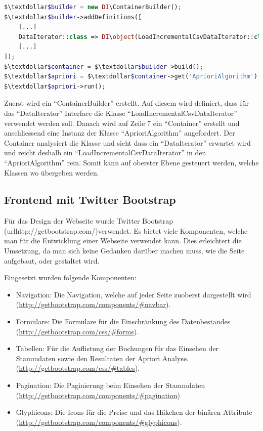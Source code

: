\begin{lstlisting}[language=php]
$\textdollar$builder = new DI\ContainerBuilder();
$\textdollar$builder->addDefinitions([
    [...]
    DataIterator::class => DI\object(LoadIncrementalCsvDataIterator::class),
    [...]
]);
$\textdollar$container = $\textdollar$builder->build();
$\textdollar$apriori = $\textdollar$container->get('AprioriAlgorithm');
$\textdollar$apriori->run();
\end{lstlisting}

Zuerst wird ein "`ContainerBuilder"' erstellt. Auf diesem wird definiert, dass für das "`DataIterator"' Interface die Klasse "`LoadIncrementalCsvDataIterator"' verwendet werden soll. Danach wird auf Zeile 7 ein "`Container"' erstellt und anschliessend eine Instanz der Klasse "`AprioriAlgorithm"' angefordert. Der Container analysiert die Klasse und sieht dass ein "`DataIterator"' erwartet wird und reicht deshalb ein "`LoadIncrementalCsvDataIterator"' in den "`AprioriAlgorithm"' rein. Somit kann auf oberster Ebene gesteuert werden, welche Klassen wo übergeben werden.

\subsection{Frontend mit Twitter Bootstrap}
\label{sec:proofofconcept:externebibliotheken:bootstrap}
Für das Design der Webseite wurde Twitter Bootstrap (url{http://getbootstrap.com/})verwendet. Es bietet viele Komponenten, welche man für die Entwicklung einer Webseite verwendet kann. Dies erleichtert die Umsetzung, da man sich keine Gedanken darüber machen muss, wie die Seite aufgebaut, oder gestaltet wird. 

Eingesetzt wurden folgende Komponenten:
\begin{itemize}
	\item Navigation: Die Navigation, welche auf jeder Seite zuoberst dargestellt wird (\url{http://getbootstrap.com/components/#navbar}).
	\item Formulare: Die Formulare für die Einschränkung des Datenbestandes (\url{http://getbootstrap.com/css/#forms}).
	\item Tabellen: Für die Auflistung der Buchungen für das Einsehen der Stammdaten sowie den Resultaten der Apriori Analyse. (\url{http://getbootstrap.com/css/#tables}).
	\item Pagination: Die Paginierung beim Einsehen der Stammdaten (\url{http://getbootstrap.com/components/#pagination})
	\item Glyphicons: Die Icons für die Preise und das Häkchen der binären Attribute (\url{http://getbootstrap.com/components/#glyphicons}).
\end{itemize}

